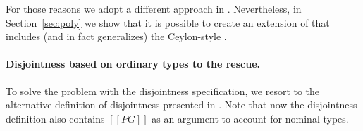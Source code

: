 \noindent For those reasons we adopt a different approach in \name.
Nevertheless, in Section~\ref{sec:poly} we show that it is possible to
create an extension of \name that includes (and in fact generalizes)
the Ceylon-style .

\paragraph*{Disjointness based on ordinary types to the rescue.}
To solve the problem with the disjointness specification, we resort to
the alternative definition of disjointness presented in .
Note that now the disjointness definition also contains $[[PG]]$ as an argument
to account for nominal types.

\begin{definition}[$[[/\]]$-Disjointness]
\label{def:inter:disj}
  $[[PG]]$ $[[|-]]$ $[[A *s B]]$ $\Coloneqq$ $\nexists$ $[[Cord]]$, $[[PG |- Cord <: A]]$ and $[[PG |- Cord <: B]]$.
\end{definition}

